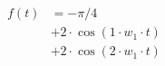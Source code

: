 \begin{center}
\begin{align*}
f(t) &= -\pi/4 \\
&+ 2 \cdot \cos( 1 \cdot w_1 \cdot t) \\
&+ 2 \cdot \cos( 2 \cdot w_1 \cdot t)
\end{align*}
\end{center}
